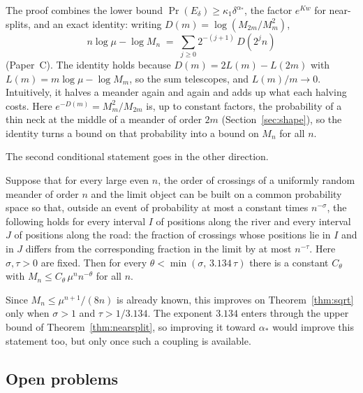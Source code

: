 The proof combines the lower bound $\Pr(E_\delta)\ge \kappa_1\delta^{\alpha_*}$, the factor $e^{Kw}$
for near-splits, and an exact identity: writing $D(m)=\log(M_{2m}/M_m^2)$,
\[ n\log\mu-\log M_n \;=\; \sum_{j\ge0} 2^{-(j+1)}\, D(2^j n) \]
(Paper~C). The identity holds because $D(m)=2L(m)-L(2m)$ with $L(m)=m\log\mu-\log M_m$, so the sum
telescopes, and $L(m)/m\to0$. Intuitively, it halves a meander again and again and adds up what
each halving costs. Here $e^{-D(m)}=M_m^2/M_{2m}$ is, up to constant factors, the probability of a
thin neck at the middle of a meander of order $2m$ (Section~\ref{sec:shape}), so the identity turns
a bound on that probability into a bound on $M_n$ for all $n$.

The second conditional statement goes in the other direction.

\begin{proposition}\label{prop:condupper}
Suppose that for every large even $n$, the order of crossings of a uniformly random meander of
order $n$ and the limit object can be built on a common probability space so that, outside an
event of probability at most a constant times $n^{-\sigma}$, the following holds for every interval $I$ of positions along the river and every
interval $J$ of positions along the road: the fraction of crossings whose positions lie in $I$
and in $J$ differs from the corresponding fraction in the limit by at most $n^{-\tau}$. Here
$\sigma,\tau>0$ are fixed. Then for every $\theta<\min(\sigma,\,3.134\,\tau)$ there is a constant
$C_\theta$ with $M_n\le C_\theta\,\mu^n n^{-\theta}$ for all $n$.
\end{proposition}

Since $M_n\le\mu^{n+1}/(8n)$ is already known, this improves on Theorem~\ref{thm:sqrt} only when
$\sigma>1$ and $\tau>1/3.134$. The exponent $3.134$ enters through the upper bound of
Theorem~\ref{thm:nearsplit}, so improving it toward $\alpha_*$ would improve this statement too,
but only once such a coupling is available.

\subsection{Open problems}

